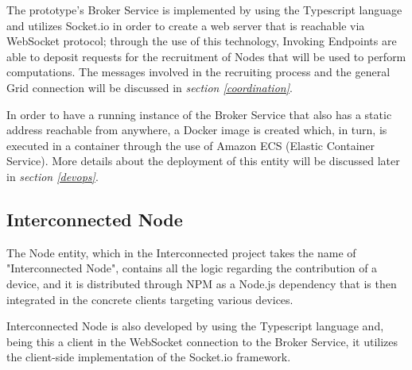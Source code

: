 The prototype's Broker Service is implemented by using the Typescript language and utilizes Socket.io in order to create a web server that is reachable via WebSocket protocol; through the use of this technology, Invoking Endpoints are able to deposit requests for the recruitment of Nodes that will be used to perform computations. The messages involved in the recruiting process and the general Grid connection will be discussed in \textit{section \ref{coordination}}.

In order to have a running instance of the Broker Service that also has a static address reachable from anywhere, a Docker image is created which, in turn, is executed in a container through the use of Amazon ECS (Elastic Container Service). More details about the deployment of this entity will be discussed later in \textit{section \ref{devops}}.

\subsection{Interconnected Node}\label{interconnected_node}
The Node entity, which in the Interconnected project takes the name of "Interconnected Node", contains all the logic regarding the contribution of a device, and it is distributed through NPM as a Node.js dependency that is then integrated in the concrete clients targeting various devices.

Interconnected Node is also developed by using the Typescript language and, being this a client in the WebSocket connection to the Broker Service, it utilizes the client-side implementation of the Socket.io framework.

